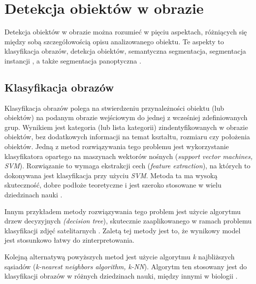 \section{Detekcja obiektów w obrazie}
\label{sec:typy_detekcji}

Detekcja obiektów w obrazie można rozumieć w pięciu aspektach, różniących się między sobą szczegółowością opisu analizowanego obiektu. Te aspekty to klasyfikacja obrazów, detekcja obiektów, semantyczna segmentacja, segmentacja instancji \cite{survey-of-object-classification}, a także segmentacja panoptyczna \cite{panoptic-segmentation}.

\subsection*{Klasyfikacja obrazów}
Klasyfikacja obrazów polega na stwierdzeniu przynależności obiektu (lub obiektów) na podanym obrazie wejściowym do jednej z wcześniej zdefiniowanych grup. Wynikiem jest kategoria (lub lista kategorii) zindentyfikowanych w obrazie obiektów, bez dodatkowych informacji na temat kształtu, rozmiaru czy położenia obiektów. Jedną z metod rozwiązywania tego problemu jest wykorzystanie klasyfikatora opartego na maszynach wektorów nośnych (\textit{support vector machines, SVM}). Rozwiązanie to wymaga ekstrakcji cech (\textit{feature extraction}), na których to dokonywana jest klasyfikacja przy użyciu \textit{SVM}. Metoda ta ma wysoką skuteczność, dobre podłoże teoretyczne i jest szeroko stosowane w wielu dziedzinach nauki \cite{analysis-image-classification}.

Innym przykładem metody rozwiązywania tego problem jest użycie algorytmu drzew decyzyjnych \textit{(decision tree}), skutecznie zaaplikowanego w ramach problemu klasyfikacji zdjęć satelitarnych \cite{decision-image-classifier}. Zaletą tej metody jest to, że wynikowy model jest stosunkowo łatwy do zinterpretowania.

Kolejną alternatywą powyższych metod jest użycie algorytmu \textit{k} najbliższych sąsiadów (\textit{k-nearest neighbors algorithm, k-NN}). Algorytm ten stosowany jest do klasyfikacji obrazów w różnych dziedzinach nauki, między innymi w biologii \cite{analysis-image-classification}.

